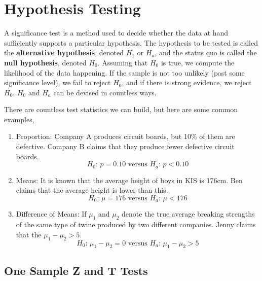 \documentclass{article}
\begin{document}
\section{Hypothesis Testing}

    A significance test is a method used to decide whether the data at hand sufficiently supports a particular hypothesis. The hypothesis to be tested is called the \textbf{alternative hypothesis}, denoted $H_1$ or $H_a$, and the status quo is called the \textbf{null hypothesis}, denoted $H_0$. Assuming that $H_0$ is true, we compute the likelihood of the data happening. If the sample is not too unlikely (past some significance level), we fail to reject $H_0$, and if there is strong evidence, we reject $H_0$. $H_0$ and $H_a$ can be devised in countless ways. 

    \begin{example}
      There are countless test statistics we can build, but here are some common examples, 
      \begin{enumerate}
        \item Proportion: Company A produces circuit boards, but 10\% of them are defective. Company B claims that they produce fewer defective circuit boards. 
        \begin{equation}
          H_0 : \, p = 0.10 \text{ versus } H_a : \, p < 0.10
        \end{equation}
        
        \item Means: It is known that the average height of boys in KIS is 176cm. Ben claims that the average height is lower than this. 
        \begin{equation}
          H_0 : \, \mu = 176 \text{ versus } H_a : \, \mu < 176
        \end{equation}
        
        \item Difference of Means: If $\mu_1$ and $\mu_2$ denote the true average breaking strengths of the same type of twine produced by two different companies. Jenny claims that the $\mu_1 - \mu_2 > 5$. 
        \begin{equation}
          H_0 : \, \mu_1 - \mu_2 = 0 \text{ versus } H_a : \, \mu_1 - \mu_2 > 5
        \end{equation}
      \end{enumerate}
    \end{example}

  \subsection{One Sample Z and T Tests}
\end{document}
